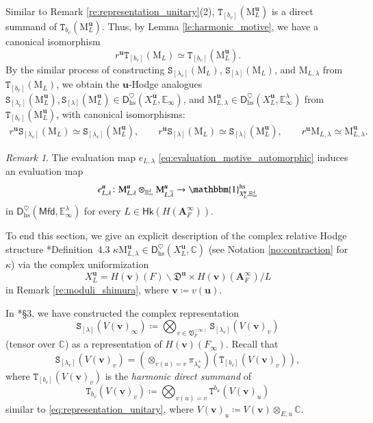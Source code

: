 \documentclass[12pt]{amsart}
\numberwithin{equation}{section}
\theoremstyle{plain}
\theoremstyle{definition}
\theoremstyle{remark}
\newtheorem{remark}[proposition]{Remark}
\renewcommand{\b}[1]{\mathbf{#1}}
\renewcommand{\d}[1]{\mathbb{#1}}
\newcommand{\f}[1]{\mathfrak{#1}}
\renewcommand{\r}[1]{\mathrm{#1}}
\renewcommand{\sf}[1]{\mathsf{#1}}
\renewcommand{\(}{\left(}
\renewcommand{\)}{\right)}
\newcommand{\ol}[1]{\overline{#1}{}}
\newcommand{\bA}{\b A}
\newcommand{\dC}{\d C}
\newcommand{\dE}{\d E}
\newcommand{\fD}{\f D}
\newcommand{\fV}{\f V}
\newcommand{\rM}{\r M}
\newcommand{\sfD}{\sf D}
\newcommand{\tS}{\mathtt{S}}
\newcommand{\tT}{\mathtt{T}}
\newcommand{\bbu}{\boldsymbol{u}}
\newcommand{\bbv}{\boldsymbol{v}}
\newcommand{\hs}{\r{hs}}
\newcommand{\Mfd}{\sf{Mfd}}
\newcommand{\Hk}{\sf{Hk}}
\begin{document}
Similar to Remark \ref{re:representation_unitary}(2), $\tT_{[b_v]}(\rM_L^{\bbu})$ is a direct summand of $\tT_{b_v}(\rM_L^{\bbu})$. Thus, by Lemma \ref{le:harmonic_motive}, we have a canonical isomorphism
\[
r^{\bbu}\tT_{[b_v]}(\rM_L)\simeq\tT_{[b_v]}(\rM_L^{\bbu}).
\]
By the similar process of constructing $\tS_{[\lambda_v]}(\rM_L)$, $\tS_{[\lambda]}(\rM_L)$, and $\rM_{L,\lambda}$ from $\tT_{[b_v]}(\rM_L)$, we obtain the $\bbu$-Hodge analogues $\tS_{[\lambda_v]}(\rM_L^{\bbu}),\tS_{[\lambda]}(\rM_L^{\bbu})\in\sfD_{\hs}^\heartsuit(X_L^{\bbu},\dE_\infty)$, and $\rM_{L,\lambda}^{\bbu}\in\sfD_{\hs}^\heartsuit(X_L^{\bbu},\dE^\lambda_\infty)$ from $\tT_{[b_v]}(\rM_L^{\bbu})$, with canonical isomorphisms:
\begin{align}\label{eq:realization_hodge}
r^{\bbu}\tS_{[\lambda_v]}(\rM_L)\simeq\tS_{[\lambda_v]}(\rM_L^{\bbu}),\qquad
r^{\bbu}\tS_{[\lambda]}(\rM_L)\simeq\tS_{[\lambda]}(\rM_L^{\bbu}),\qquad
r^{\bbu}\rM_{L,\lambda}\simeq\rM_{L,\lambda}^{\bbu}.
\end{align}

\begin{remark}
The evaluation map $e_{L,\lambda}$ \eqref{eq:evaluation_motive_automorphic} induces an evaluation map
\begin{align}\label{eq:realization_hodge_automorphic}
e_{L,\lambda}^{\bbu}\colon\rM_{L,\lambda}^{\bbu}\otimes_{\dE^\lambda_\infty}\rM_{L,\ol\lambda}^{\bbu}
\to\mathbbm{1}^{\hs}_{X_L^{\bbu},\dE^\lambda_\infty}
\end{align}
in $\sfD_{\hs}^\heartsuit(\Mfd,\dE^\lambda_\infty)$ for every $L\in\Hk(H(\bA_F^\infty))$.
\end{remark}


To end this section, we give an explicit description of the complex relative Hodge structure \cite{Liu26}*{Definition~4.3} $\kappa\rM_{L,\lambda}^{\bbu}\in\sfD_{\hs}^\heartsuit(X_L^{\bbu},\dC)$ (see Notation \ref{no:contraction} for $\kappa$) via the complex uniformization
\[
X_L^{\bbu}=H(\bbv)(F)\backslash\fD^{\bbu}\times H(\bbv)(\bA_F^\infty)/L
\]
in Remark \ref{re:moduli_shimura}, where $\bbv\coloneqq v(\bbu)$.

In \cite{Liu26}*{\S3}, we have constructed the complex representation
\[
\tS_{[\lambda]}(V(\bbv)_\infty)\coloneqq\bigotimes_{v\in\fV_F^{(\infty)}}\tS_{[\lambda_v]}(V(\bbv)_v)
\]
(tensor over $\dC$) as a representation of $H(\bbv)(F_\infty)$. Recall that
\[
\tS_{[\lambda_v]}(V(\bbv)_v)=(\otimes_{v(u)=v}\pi_{\lambda_u^+})\(\tT_{[b_v]}(V(\bbv)_v)\),
\]
where $\tT_{[b_v]}(V(\bbv)_v)$ is the \emph{harmonic direct summand} of
\[
\tT_{b_v}(V(\bbv)_v)\coloneqq\bigotimes_{v(u)=v}\tT^{b_u}(V(\bbv)_u)
\]
similar to \eqref{eq:representation_unitary}, where $V(\bbv)_u\coloneqq V(\bbv)\otimes_{E,u}\dC$.
\end{document}
